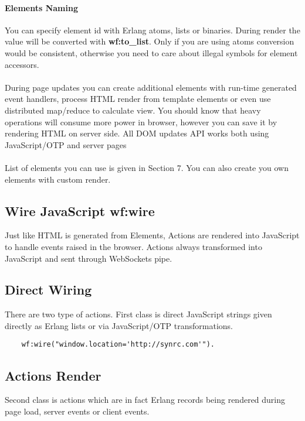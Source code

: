 \paragraph{\bf Elements Naming}
You can specify element id with Erlang atoms,
lists or binaries. During render the value will be converted
with {\bf wf:to\_list}. Only if you are using atoms conversion would be consistent,
otherwise you need to care about illegal symbols for element accessors.

\paragraph{}
During page updates you can create additional elements with
run-time generated event handlers, process HTML render from
template elements or even use distributed map/reduce to calculate view.
You should know that heavy operations will consume
more power in browser, however you can save it by rendering
HTML on server side. All DOM updates API works both using
JavaScript/OTP and server pages 

\paragraph{}
List of elements you can use is given in Section 7. You can also create
you own elements with custom render.

\subsection{Wire JavaScript \bf{wf:wire}}
Just like HTML is generated from Elements, Actions are rendered into
JavaScript to handle events raised in the browser. Actions always
transformed into JavaScript and sent through WebSockets pipe.

\subsection*{Direct Wiring}
There are two type of actions. First class is direct JavaScript
strings given directly as Erlang lists or via JavaScript/OTP
transformations.

\vspace{1\baselineskip}
\begin{lstlisting}
    wf:wire("window.location='http://synrc.com'").
\end{lstlisting}

\subsection*{Actions Render}
Second class is actions which are in fact Erlang records being
rendered during page load, server events or client events.

